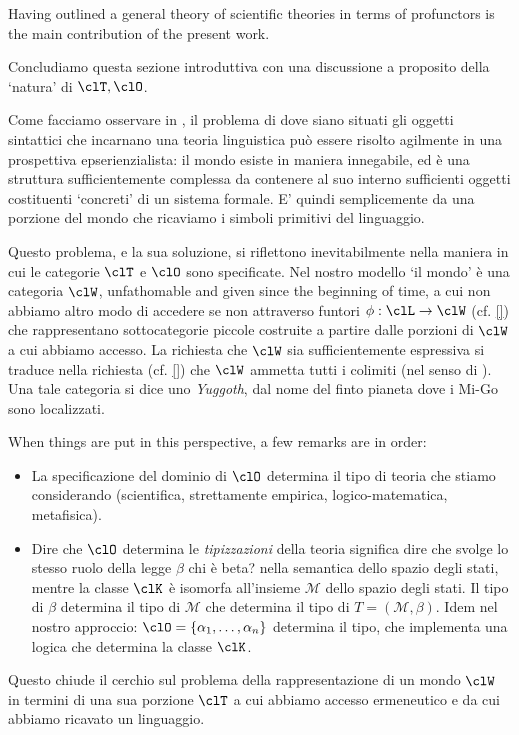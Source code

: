 Having outlined a general theory of scientific theories in terms of profunctors is the main contribution of the present work.

Concludiamo questa sezione introduttiva con una discussione a proposito della `natura' di $\clT,\clO$.

Come facciamo osservare in \cite{canont1}, il problema di dove siano situati gli oggetti sintattici che incarnano una teoria linguistica può essere risolto agilmente in una prospettiva epserienzialista: il mondo esiste in maniera innegabile, ed è una struttura sufficientemente complessa da contenere al suo interno sufficienti oggetti costituenti `concreti' di un sistema formale. E' quindi semplicemente da una porzione del mondo che ricaviamo i simboli primitivi del linguaggio.

Questo problema, e la sua soluzione, si riflettono inevitabilmente nella maniera in cui le categorie $\clT$ e $\clO$ sono specificate. Nel nostro modello `il mondo' è una categoria $\clW$, unfathomable and given since the beginning of time, a cui non abbiamo altro modo di accedere se non attraverso funtori $\phi : \clL \to \clW$ (cf. \autoref{}) che rappresentano sottocategorie piccole costruite a partire dalle porzioni di $\clW$ a cui abbiamo accesso. La richiesta che $\clW$ sia sufficientemente espressiva si traduce nella richiesta (cf. \autoref{}) che $\clW$ ammetta tutti i colimiti (nel senso di \cite[??]{Bor1}). Una tale categoria si dice uno \emph{Yuggoth}, dal nome del finto pianeta dove i Mi-Go sono localizzati.

When things are put in this perspective, a few remarks are in order: 
\begin{itemize}
	\item La specificazione del dominio di $\clO$ determina il tipo di teoria che stiamo considerando (scientifica, strettamente empirica, logico-matematica, metafisica).
	\item Dire che $\clO$ determina le \emph{tipizzazioni} della teoria significa dire che svolge lo stesso ruolo della legge $\beta$ {\color{red} chi è beta?} nella semantica dello spazio degli stati, mentre la classe $\clK$ è isomorfa all'insieme $\mathcal{M}$ dello spazio degli stati. Il tipo di $\beta$ determina il tipo di $\mathcal{M}$ che determina il tipo di $T = (\mathcal{M}, \beta)$. Idem nel nostro approccio: $\clO 	= \{\alpha_1,\dots,\alpha_n\}$ determina il tipo, che implementa una logica che determina la classe $\clK$.
\end{itemize}
Questo chiude il cerchio sul problema della rappresentazione di un mondo $\clW$ in termini di una sua porzione $\clT$ a cui abbiamo accesso ermeneutico e da cui abbiamo ricavato un linguaggio.

